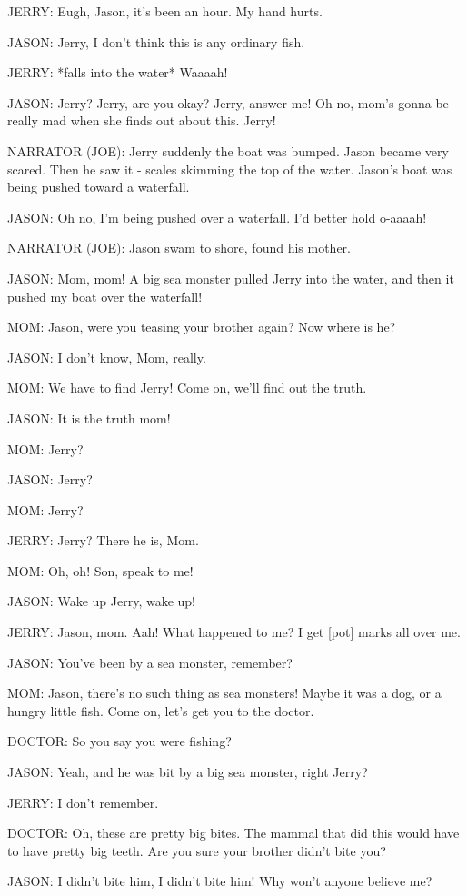 JERRY:
Eugh, Jason, it's been an hour.
My hand hurts.

JASON:
Jerry, I don't think this is any ordinary fish.

JERRY:
*falls into the water*
Waaaah!

JASON:
Jerry?
Jerry, are you okay?
Jerry, answer me!
Oh no, mom's gonna be really mad when she finds out about this.
Jerry!

NARRATOR (JOE):
Jerry suddenly the boat was bumped.
Jason became very scared.
Then he saw it - scales skimming the top of the water.
Jason's boat was being pushed toward a waterfall.

JASON:
Oh no, I'm being pushed over a waterfall.
I'd better hold o-aaaah!

NARRATOR (JOE):
Jason swam to shore, found his mother.

JASON:
Mom, mom!
A big sea monster pulled Jerry into the water, and then it pushed my boat over the waterfall!

MOM:
Jason, were you teasing your brother again?
Now where is he?

JASON:
I don't know, Mom, really.

MOM:
We have to find Jerry!
Come on, we'll find out the truth.

JASON:
It is the truth mom!

MOM:
Jerry?

JASON:
Jerry?

MOM:
Jerry?

JERRY:
Jerry?
There he is, Mom.

MOM:
Oh, oh!
Son, speak to me!

JASON:
Wake up Jerry, wake up!

JERRY:
Jason, mom.
Aah!
What happened to me?
I get [pot] marks all over me.

JASON:
You've been by a sea monster, remember?

MOM:
Jason, there's no such thing as sea monsters!
Maybe it was a dog, or a hungry little fish.
Come on, let's get you to the doctor.

DOCTOR:
So you say you were fishing?

JASON:
Yeah, and he was bit by a big sea monster, right Jerry?

JERRY:
I don't remember.

DOCTOR:
Oh, these are pretty big bites.
The mammal that did this would have to have pretty big teeth.
Are you sure your brother didn't bite you?

JASON:
I didn't bite him, I didn't bite him!
Why won't anyone believe me?

